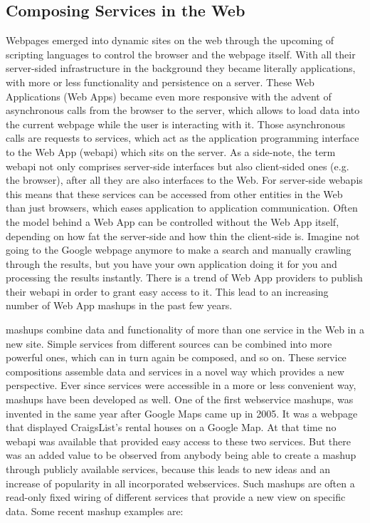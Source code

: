 \subsection{Composing Services in the Web}
Webpages emerged into dynamic sites on the web through the upcoming of scripting languages to control the browser and the webpage itself.
With all their server-sided infrastructure in the background they became literally applications, with more or less functionality and persistence on a server.
These \textrm{Web Applications (Web Apps)} became even more responsive with the advent of asynchronous calls from the browser to the server, which allows to load data into the current webpage while the user is interacting with it.
Those asynchronous calls are requests to services, which act as the application programming interface to the \textrm{Web App} (\textrm{\gls{webapi}}) which sits on the server.
As a side-note, the term \textrm{\gls{webapi}} not only comprises server-side interfaces but also client-sided ones (e.g. the browser), after all they are also interfaces to the Web.
For server-side \textrm{\gls{webapi}s} this means that these services can be accessed from other entities in the Web than just browsers, which eases application to application communication.
Often the model behind a \textrm{Web App} can be controlled without the \textrm{Web App} itself, depending on how fat the server-side and how thin the client-side is.
Imagine not going to the Google webpage anymore to make a search and manually crawling through the results, but you have your own application doing it for you and processing the results instantly.
There is a trend of \textrm{Web App} providers to publish their \textrm{\gls{webapi}} in order to grant easy access to it.
This lead to an increasing number of \textrm{Web App \glspl{mashup}} in the past few years.

\textrm{\glspl{mashup}} combine data and functionality of more than one service in the Web in a new site.
Simple services from different sources can be combined into more powerful ones, which can in turn again be composed, and so on.
These service compositions assemble data and services in a novel way which provides a new perspective.
Ever since services were accessible in a more or less convenient way, \textrm{\glspl{mashup}} have been developed as well.
One of the first \textrm{\gls{webservice} \glspl{mashup}}\cite{wwwHosuingMaps}, was invented in the same year after Google Maps came up in 2005.
It was a webpage that displayed CraigsList's rental houses on a Google Map.
At that time no \textrm{\gls{webapi}} was available that provided easy access to these two services.
But there was an added value to be observed from anybody being able to create a \textrm{\gls{mashup}} through publicly available services, because this leads to new ideas and an increase of popularity in all incorporated \textrm{\glspl{webservice}}.
Such \textrm{\glspl{mashup}} are often a read-only fixed wiring of different services that provide a new view on specific data.
Some recent \textrm{\gls{mashup}} examples are:


